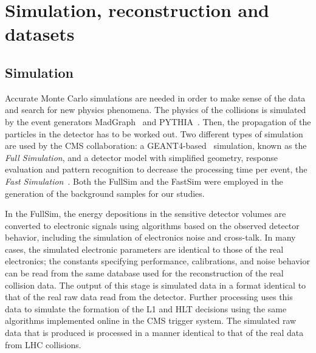 \chapter{Simulation, reconstruction and datasets}
\section{Simulation}\label{sec:fast_sim}
Accurate Monte Carlo simulations are needed in order to make sense of the
data and search for new physics phenomena. The physics of the collisions is
simulated by the event generators MadGraph~\cite{madgraph} and PYTHIA~\cite{fs:pythia}. Then, the propagation of the particles in the detector has to be worked out.
Two different types of simulation are used by the CMS collaboration: a
GEANT4-based~\cite{fs:geant} simulation, known as the \emph{Full
Simulation}, and a detector model with simplified geometry, response
evaluation and pattern recognition to decrease the processing time per
event, the \emph{Fast Simulation}~\cite{fs:fast.simulation}. Both the
FullSim and the FastSim were employed in the generation of the background
samples for our studies.

In the FullSim, the energy depositions in the sensitive detector volumes are converted to electronic
signals using algorithms based on the observed detector behavior, including the simulation of
electronics noise and cross-talk. In many cases, the simulated electronic parameters are identical to
those of the real electronics; the constants specifying performance, calibrations, and noise behavior
can be read from the same database used for the reconstruction of the real collision data. The output of
this stage is simulated data in a format identical to that of the real raw data read from the detector.
Further processing uses this data to simulate the formation of the L1 and
HLT decisions using the same algorithms implemented online in the CMS trigger system. The simulated
raw data that is produced is processed in a manner identical to that of the real data from
LHC collisions.

